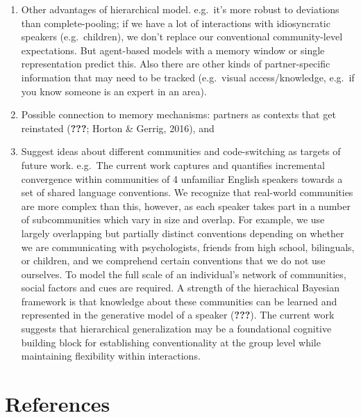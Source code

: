 \documentclass[10pt, letterpaper]{article}
\begin{document}
\begin{enumerate}
\def\labelenumi{\arabic{enumi}.}
\item
  Other advantages of hierarchical model. e.g.~it's more robust to
  deviations than complete-pooling; if we have a lot of interactions
  with idiosyncratic speakers (e.g.~children), we don't replace our
  conventional community-level expectations. But agent-based models with
  a memory window or single representation predict this. Also there are
  other kinds of partner-specific information that may need to be
  tracked (e.g.~visual access/knowledge, e.g.~if you know someone is an
  expert in an area).
\item
  Possible connection to memory mechanisms: partners as contexts that
  get reinstated ({\textbf{???}}; Horton \& Gerrig, 2016), and
\item
  Suggest ideas about different communities and code-switching as
  targets of future work. e.g.~The current work captures and quantifies
  incremental convergence within communities of 4 unfamiliar English
  speakers towards a set of shared language conventions. We recognize
  that real-world communities are more complex than this, however, as
  each speaker takes part in a number of subcommunities which vary in
  size and overlap. For example, we use largely overlapping but
  partially distinct conventions depending on whether we are
  communicating with psychologists, friends from high school,
  bilinguals, or children, and we comprehend certain conventions that we
  do not use ourselves. To model the full scale of an individual's
  network of communities, social factors and cues are required. A
  strength of the hierachical Bayesian framework is that knowledge about
  these communities can be learned and represented in the generative
  model of a speaker ({\textbf{???}}). The current work suggests that
  hierarchical generalization may be a foundational cognitive building
  block for establishing conventionality at the group level while
  maintaining flexibility within interactions.
\end{enumerate}

\hypertarget{references}{%
\section{References}\label{references}}
\end{document}
